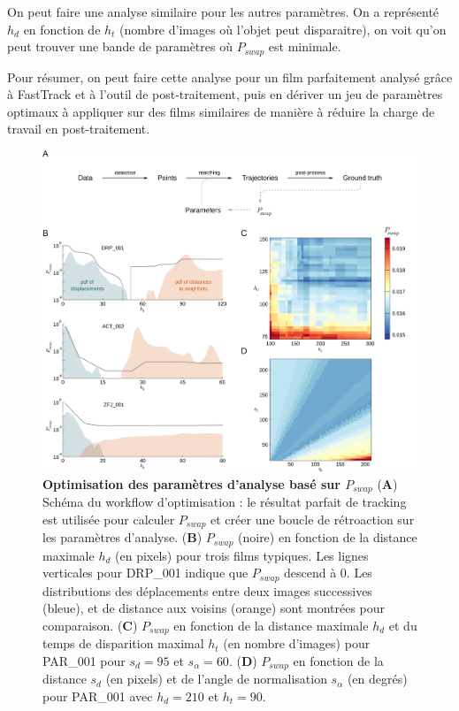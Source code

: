 	On peut faire une analyse similaire pour les autres paramètres. On a représenté $h_d$ en fonction de $h_t$ (nombre d'images où l'objet peut disparaitre), on voit qu'on peut trouver une bande de paramètres où $P_{swap}$ est minimale.
	
	Pour résumer, on peut faire cette analyse pour un film parfaitement analysé grâce à FastTrack et à l'outil de post-traitement, puis en dériver un jeu de paramètres optimaux à appliquer sur des films similaires de manière à réduire la charge de travail en post-traitement.

	
	\begin{figure}[h]
    \centering
    \includegraphics[width=1\textwidth]{part_1/assets/Figure_4.png}    
    \caption{\textbf{Optimisation des paramètres d'analyse basé sur $P_{swap}$} (\textbf{A}) Schéma du workflow d'optimisation : le résultat parfait de tracking est utilisée pour calculer $P_{swap}$ et créer une boucle de rétroaction sur les paramètres d'analyse. (\textbf{B}) $P_{swap}$ (noire) en fonction de la distance maximale $h_d$ (en pixels) pour trois films typiques. Les lignes verticales pour DRP\_001 indique que $P_{swap}$ descend à 0. Les distributions des déplacements entre deux images successives (bleue), et de distance aux voisins (orange) sont montrées pour comparaison. (\textbf{C}) $P_{swap}$ en fonction de la distance maximale $h_d$ et du temps de disparition maximal $h_t$ (en nombre d'images) pour PAR\_001 pour $s_d=95$ et $s_{\alpha}=60$. (\textbf{D}) $P_{swap}$ en fonction de la distance $s_d$ (en pixels) et de l'angle de normalisation $s_{\alpha}$ (en degrés) pour PAR\_001 avec $h_d=210$ et $h_t=90$. } 
    \label{part_1:fig_4}
    \end{figure}
	
